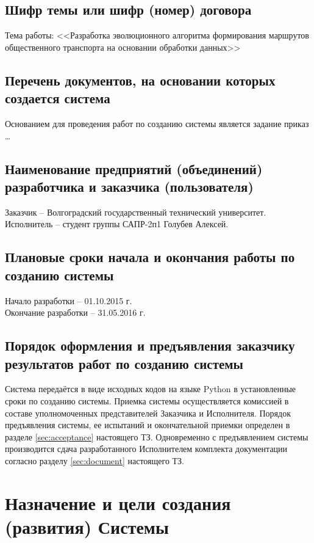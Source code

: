 \section{Шифр темы или шифр (номер) договора}
Тема работы: <<Разработка эволюционного алгоритма формирования маршрутов 
общественного транспорта на основании обработки данных>>

\section{Перечень документов, на основании которых создается система}
Основанием для проведения работ по созданию системы является задание приказ \ldots

\section{Наименование предприятий (объединений) разработчика и заказчика (пользователя)}
Заказчик -- Волгоградский государственный технический университет.\\
Исполнитель -- студент группы САПР-2п1 Голубев Алексей.

\section{Плановые сроки начала и окончания работы по созданию системы}
Начало разработки -- 01.10.2015 г.\\
Окончание разработки -- 31.05.2016 г.

\section{Порядок оформления и предъявления заказчику результатов работ по созданию системы}
Система передаётся в виде исходных кодов на языке Python в установленные сроки по созданию системы.
Приемка системы осуществляется комиссией в составе уполномоченных представителей Заказчика и Исполнителя. 
Порядок предъявления системы, ее испытаний и окончательной приемки определен в разделе \ref{sec:acceptance} 
настоящего ТЗ. Одновременно с предъявлением системы производится сдача разработанного Исполнителем комплекта 
документации согласно разделу \ref{sec:document} настоящего ТЗ.

\vspace{3em}
\chapter{Назначение и цели создания (развития) Системы}
